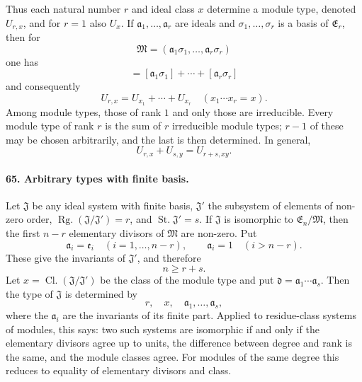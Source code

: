 \documentclass[11pt]{article}
\newcommand{\Rg}{\operatorname{Rg.}}
\newcommand{\Kl}{\operatorname{Cl.}}
\newcommand{\St}{\operatorname{St.}}
\begin{document}
Thus each natural number $r$ and ideal class $x$ determine a module type, denoted $U_{r,x}$, and for $r=1$ also $U_x$. If $\mathfrak a_1,
\ldots,
\mathfrak a_r$ are ideals and $\sigma_1,
\ldots,
\sigma_r$ is a basis of $\mathfrak E_r$, then for
\[
  \mathfrak M=(\mathfrak a_1\sigma_1,
\ldots,
\mathfrak a_r\sigma_r)
\]
one has
\begin{equation}
  [\mathfrak M]=[\mathfrak a_1\sigma_1]+\cdots+[\mathfrak a_r\sigma_r]
\tag{120}
\end{equation}
and consequently
\begin{equation}
  U_{r,x}=U_{x_1}+\cdots+U_{x_r}
  \quad (x_1\cdots x_r=x).
\tag{121}
\end{equation}
Among module types, those of rank $1$ and only those are irreducible. Every module type of rank $r$ is the sum of $r$ irreducible module types; $r-1$ of these may be chosen arbitrarily, and the last is then determined. In general,
\[
  U_{r,x}+U_{s,y}=U_{r+s,xy}.
\]

\paragraph{65. Arbitrary types with finite basis.}
Let $\mathfrak J$ be any ideal system with finite basis, $\mathfrak J'$ the subsystem of elements of non-zero order, $\Rg(\mathfrak J/\mathfrak J')=r$, and $\St\mathfrak J'=s$. If $\mathfrak J$ is isomorphic to $\mathfrak E_n/\mathfrak M$, then the first $n-r$ elementary divisors of $\mathfrak M$ are non-zero. Put
\[
  \mathfrak a_i=\mathfrak e_i\quad (i=1,
\ldots,n-r),
  \qquad
  \mathfrak a_i=1\quad (i>n-r).
\]
These give the invariants of $\mathfrak J'$, and therefore
\begin{equation}
  n\ge r+s.
\tag{122}
\end{equation}
Let $x=\Kl(\mathfrak J/\mathfrak J')$ be the class of the module type and put $\mathfrak d=\mathfrak a_1\cdots\mathfrak a_s$. Then the type of $\mathfrak J$ is determined by
\begin{equation}
  r,
  \quad x,
  \quad \mathfrak a_1,
\ldots,
\mathfrak a_s,
\tag{123}
\end{equation}
where the $\mathfrak a_i$ are the invariants of its finite part. Applied to residue-class systems of modules, this says: two such systems are isomorphic if and only if the elementary divisors agree up to units, the difference between degree and rank is the same, and the module classes agree. For modules of the same degree this reduces to equality of elementary divisors and class.
\end{document}
